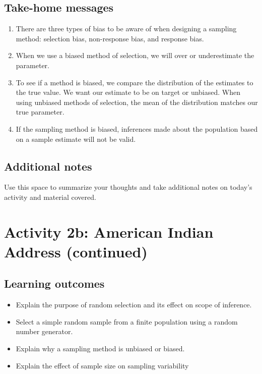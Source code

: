 \documentclass[
]{report}
\begin{document}
\hypertarget{take-home-messages-1}{%
\subsection{Take-home messages}\label{take-home-messages-1}}

\begin{enumerate}
\def\labelenumi{\arabic{enumi}.}
\item
  There are three types of bias to be aware of when designing a sampling method: selection bias, non-response bias, and response bias.
\item
  When we use a biased method of selection, we will over or underestimate the parameter.
\item
  To see if a method is biased, we compare the distribution of the estimates to the true value. We want our estimate to be on target or unbiased. When using unbiased methods of selection, the mean of the distribution matches our true parameter.
\item
  If the sampling method is biased, inferences made about the population based on a sample estimate will not be valid.
\end{enumerate}

\hypertarget{additional-notes-1}{%
\subsection{Additional notes}\label{additional-notes-1}}

Use this space to summarize your thoughts and take additional notes on today's activity and material covered.

\newpage

\hypertarget{activity-2b-american-indian-address-continued}{%
\section{Activity 2b: American Indian Address (continued)}\label{activity-2b-american-indian-address-continued}}


\hypertarget{learning-outcomes-2}{%
\subsection{Learning outcomes}\label{learning-outcomes-2}}

\begin{itemize}
\item
  Explain the purpose of random selection and its effect on scope of inference.
\item
  Select a simple random sample from a finite population using a random number generator.
\item
  Explain why a sampling method is unbiased or biased.
\item
  Explain the effect of sample size on sampling variability
\end{itemize}
\end{document}
